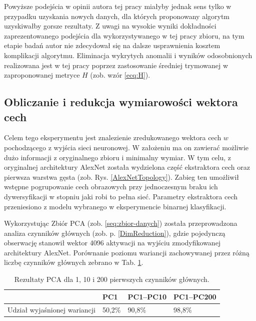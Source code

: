 Powyższe podejścia w opinii autora tej pracy miałyby jednak sens tylko w przypadku uzyskania nowych danych, dla których proponowany algorytm uzyskiwałby gorsze rezultaty. Z uwagi na wysokie wyniki dokładności zaprezentowanego podejścia dla wykorzystywanego w tej pracy zbioru, na tym etapie badań autor nie zdecydował się na dalsze usprawnienia kosztem komplikacji algorytmu. Eliminacja wykrytych anomalii i wyników odosobnionych realizowana jest w tej pracy poprzez zastosowanie średniej trymowanej w zaproponowanej metryce $H$ (zob. wzór \ref{ecq:H}).

\subsection{Obliczanie i redukcja wymiarowości wektora cech}

Celem tego eksperymentu jest znalezienie zredukowanego wektora cech $w$ pochodzącego z wyjścia sieci neuronowej. W założeniu ma on zawierać możliwie dużo informacji z oryginalnego zbioru i minimalny wymiar. W tym celu, z oryginalnej architektury AlexNet została wydzielona część ekstraktora cech oraz pierwsza warstwa gęsta (zob. Rys. \ref{AlexNetTopology}). Zabieg ten umożliwił wstępne pogrupowanie cech obrazowych przy jednoczesnym braku ich dywersyfikacji w stopniu jaki robi to pełna sieć. Parametry ekstraktora cech przeniesiono z modelu wybranego w eksperymencie binarnej klasyfikacji. 

Wykorzystując Zbiór PCA (zob. \ref{seq:zbior-danych}) została przeprowadzona analiza czynników głównych (zob. p. \ref{DimReduction}), gdzie pojedynczą obserwację stanowił wektor 4096 aktywacji na wyjściu zmodyfikowanej architektury AlexNet. Porównanie poziomu wariancji zachowywanej przez różną liczbę czynników głównych zebrano w Tab. \ref{PCA-results}.
\vspace{10px}
\renewcommand{\arraystretch}{1.2}
\begin{table}[h!]
 \setlength{\tabcolsep}{12pt}
 \centering
 \caption{Rezultaty PCA dla 1, 10 i 200 pierwszych czynników głównych.}
 \label{PCA-results}
 \begin{tabular}{l|l|l|l}
 
 & PC1 & PC1--PC10 & PC1--PC200 \\ \hline \hline
 Udział wyjaśnionej wariancji & 50,2\% & 90,8\%   & 98,8\% \\ \hline 
 \end{tabular}
 \end{table}
\renewcommand{\arraystretch}{1}

